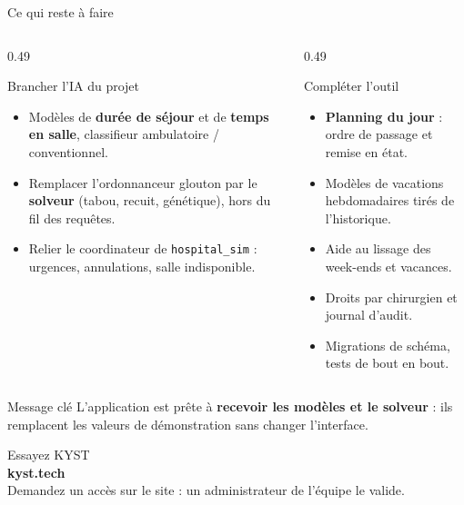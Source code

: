 \begin{frame}{Ce qui reste à faire}
  \footnotesize
  \begin{columns}[T,onlytextwidth]
    \begin{column}{0.49\textwidth}
      \begin{alertblock}{Brancher l'IA du projet}
        \begin{itemize}
          \item Modèles de \textbf{durée de séjour} et de \textbf{temps en
            salle}, classifieur ambulatoire / conventionnel.
          \item Remplacer l'ordonnanceur glouton par le \textbf{solveur}
            (tabou, recuit, génétique), hors du fil des requêtes.
          \item Relier le coordinateur de \texttt{hospital\_sim} : urgences,
            annulations, salle indisponible.
        \end{itemize}
      \end{alertblock}
    \end{column}
    \begin{column}{0.49\textwidth}
      \begin{block}{Compléter l'outil}
        \begin{itemize}
          \item \textbf{Planning du jour} : ordre de passage et remise en état.
          \item Modèles de vacations hebdomadaires tirés de l'historique.
          \item Aide au lissage des week-ends et vacances.
          \item Droits par chirurgien et journal d'audit.
          \item Migrations de schéma, tests de bout en bout.
        \end{itemize}
      \end{block}
    \end{column}
  \end{columns}
  \vspace{0.05cm}
  \begin{exampleblock}{Message clé}
    \centering
    L'application est prête à \textbf{recevoir les modèles et le solveur} :
    ils remplacent les valeurs de démonstration sans changer l'interface.
  \end{exampleblock}
\end{frame}

\begin{frame}{Essayez KYST}
  \centering
  \vspace{0.2cm}
  \\[0.45cm]
  {\LARGE\bfseries\color{mcmPrimary} kyst.tech}\\[0.25cm]
  \small Demandez un accès sur le site : un administrateur de l'équipe le valide.
\end{frame}
